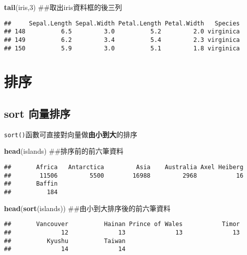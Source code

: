 \documentclass[]{book}
\newenvironment{Shaded}{\begin{snugshade}}{\end{snugshade}}
\newcommand{\KeywordTok}[1]{\textcolor[rgb]{0.13,0.29,0.53}{\textbf{{#1}}}}
\newcommand{\DecValTok}[1]{\textcolor[rgb]{0.00,0.00,0.81}{{#1}}}
\newcommand{\NormalTok}[1]{{#1}}
\begin{document}
\begin{Shaded}
\begin{Highlighting}[]
\KeywordTok{tail}\NormalTok{(iris,}\DecValTok{3}\NormalTok{) ##取出iris資料框的後三列}
\end{Highlighting}
\end{Shaded}

\begin{verbatim}
##     Sepal.Length Sepal.Width Petal.Length Petal.Width   Species
## 148          6.5         3.0          5.2         2.0 virginica
## 149          6.2         3.4          5.4         2.3 virginica
## 150          5.9         3.0          5.1         1.8 virginica
\end{verbatim}

\section{排序}

\subsection{sort 向量排序}\label{sort-}

\texttt{sort()}函數可直接對向量做\textbf{由小到大}的排序

\begin{Shaded}
\begin{Highlighting}[]
\KeywordTok{head}\NormalTok{(islands) ##排序前的前六筆資料}
\end{Highlighting}
\end{Shaded}

\begin{verbatim}
##       Africa   Antarctica         Asia    Australia Axel Heiberg 
##        11506         5500        16988         2968           16 
##       Baffin 
##          184
\end{verbatim}

\begin{Shaded}
\begin{Highlighting}[]
\KeywordTok{head}\NormalTok{(}\KeywordTok{sort}\NormalTok{(islands)) ##由小到大排序後的前六筆資料}
\end{Highlighting}
\end{Shaded}

\begin{verbatim}
##       Vancouver          Hainan Prince of Wales           Timor 
##              12              13              13              13 
##          Kyushu          Taiwan 
##              14              14
\end{verbatim}
\end{document}
